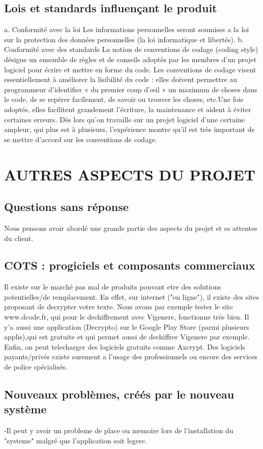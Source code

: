\documentclass[a4]{article}
\begin{document}
		\subsection{Lois et standards influençant le produit}
		a. Conformité avec la loi
Les informations personnelles seront soumises a la loi sur la protection des données
personnelles (la loi informatique et libertés).
		b. Conformité avec des standards
La notion de conventions de codage (coding style) désigne un ensemble de règles et de conseils 
adoptés par les membres d’un projet logiciel pour écrire et mettre en forme du code.
Les conventions de codage visent essentiellement à améliorer la lisibilité du code : elles doivent 
permettre au programmeur d’identifier « du premier coup d’œil » un maximum de choses dans 
le  code, de se repérer facilement, de savoir ou trouver les choses, etc.Une fois adoptés, elles
facilitent grandement l’écriture, la maintenance et aident à éviter certaines erreurs.
Dès lors qu’on travaille sur un projet logiciel d’une certaine ampleur, qui plus est à
plusieurs, l’expérience montre qu’il est très important de se mettre d’accord sur les
conventions de codage.	\section{AUTRES ASPECTS DU PROJET}
		\subsection{Questions sans réponse}
		Nous pensons avoir abordé une grande partie des aspects du projet et es attentes du client.
		\subsection{COTS : progiciels et composants commerciaux}
		Il existe sur le marché pas mal de produits pouvant etre des solutions potentielles/de remplacement. En effet, sur internet
		("en ligne"), il existe des sites proposant de decrypter votre texte. Nous avons par exemple tester le site www.dcode.fr, qui
		pour le dechiffrement avec Vigenere, fonctionne trés bien.
		Il y'a aussi une application (Decrypto) sur le Google Play Store (parmi plusieurs applis),qui est gratuite et qui permet aussi de dechiffrer Vigenere par exemple.
		Enfin, on peut telecharger des logiciels gratuits comme Axcrypt. Des logiciels payants/privés existe surement a l'usage des
		professionnels ou encore des services de police spécialisés.
		\subsection{Nouveaux problèmes, créés par le nouveau système}
		-Il peut y avoir un probleme de place ou memoire lors de l'installation du "systeme" malgré que l'application soit legere.
		
\end{document}
